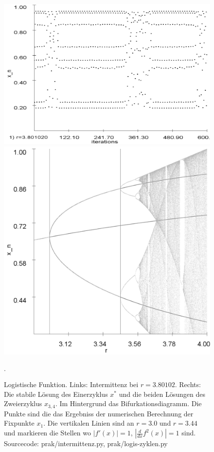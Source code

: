 \documentclass[12pt,a4paper]{article}
\begin{document}
\begin{figure}[!htbp]
\centering
\includegraphics[scale=0.22]{intermittenz}
\includegraphics[scale=0.15]{analy-periodenv}
\caption{Logistische Funktion. Links: Intermittenz bei $r=3.80102$. Rechts: Die stabile Lösung des Einerzyklus $x^*$ und die beiden Lösungen des Zweierzyklus $x_{3,4}$. Im Hintergrund das Bifurkationsdiagramm. Die Punkte sind die das Ergebniss der numerischen Berechnung der Fixpunkte $x_1$. Die vertikalen Linien sind an $r=3.0$ und $r=3.44$ und markieren die Stellen wo $|f'(x)|=1$, $|\frac{d}{dx}f^2(x)|=1$ sind. Sourcecode: prak/intermittenz.py, prak/logis-zyklen.py}. 
\label{fig:log-intermittenz-cycles}
\end{figure}
\end{document}
